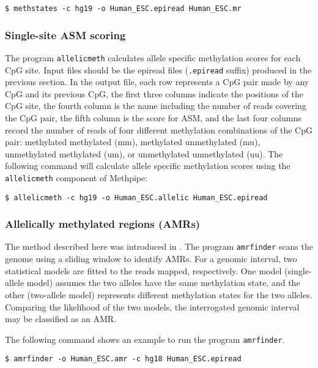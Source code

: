 \documentclass[10pt]{article}
\newcommand{\prog}[1]{\texttt{#1}}
\newcommand{\fn}[1]{\texttt{#1}}
\begin{document}
{{\begin{verbatim}
$ methstates -c hg19 -o Human_ESC.epiread Human_ESC.mr 
\end{verbatim}


\subsubsection{Single-site ASM scoring}
\label{sec:allelic_scores}

The program \prog{allelicmeth} calculates allele specific methylation
scores for each CpG site. Input files should be the epiread files
(\fn{.epiread} suffix) produced in the previous section. In the
output file, each row represents a CpG pair made by any CpG and its
previous CpG, the first three columns indicate the positions of the
CpG site, the fourth column is the name including the number of reads
covering the CpG pair, the fifth column is the score for ASM, and the
last four columns record the number of reads of four different
methylation combinations of the CpG pair: methylated methylated (mm),
methylated unmethylated (mu), unmethylated methylated (um), or
unmethylated unmethylated (uu). The following command will calculate
allele specific methylation scores using the \prog{allelicmeth}
component of Methpipe:

\begin{verbatim}
$ allelicmeth -c hg19 -o Human_ESC.allelic Human_ESC.epiread
\end{verbatim}

\subsubsection{Allelically methylated regions (AMRs)}

The method described here was introduced in \cite{fang2012genomic}.
The program \prog{amrfinder} scans the genome using a sliding window
to identify AMRs. For a genomic interval, two statistical models are
fitted to the reads mapped, respectively. One model (single-allele
model) assumes the two alleles have the same methylation state, and
the other (two-allele model) represents different methylation states
for the two alleles. Comparing the likelihood of the two models, the
interrogated genomic interval may be classified as an AMR.

The following command shows an example to run the program
\prog{amrfinder}.
\begin{verbatim}
$ amrfinder -o Human_ESC.amr -c hg18 Human_ESC.epiread
\end{verbatim}

}}
\end{document}
